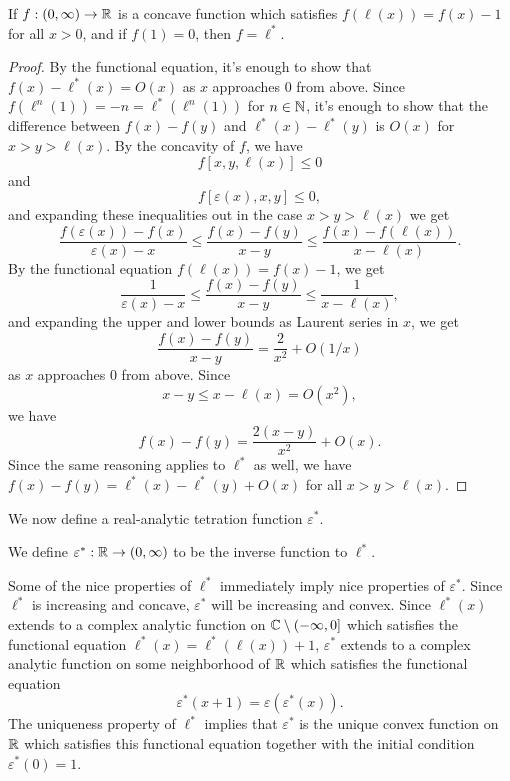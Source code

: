 \documentclass[letterpaper,11pt]{article}
\begin{document}
\begin{prop} If $f : (0,\infty) \rightarrow \mathbb{R}$ is a concave function which satisfies $f(\ell(x)) = f(x) - 1$ for all $x > 0$, and if $f(1) = 0$, then $f = \ell^*$.
\end{prop}
\begin{proof} By the functional equation, it's enough to show that $f(x) - \ell^*(x) = O(x)$ as $x$ approaches $0$ from above. Since $f(\ell^n(1)) = -n = \ell^*(\ell^n(1))$ for $n \in \mathbb{N}$, it's enough to show that the difference between $f(x) - f(y)$ and $\ell^*(x) - \ell^*(y)$ is $O(x)$ for $x > y > \ell(x)$. By the concavity of $f$, we have
\[
f[x,y,\ell(x)] \le 0
\]
and
\[
f[\varepsilon(x),x,y] \le 0,
\]
and expanding these inequalities out in the case $x > y > \ell(x)$ we get
\[
\frac{f(\varepsilon(x)) - f(x)}{\varepsilon(x) - x} \le \frac{f(x) - f(y)}{x-y} \le \frac{f(x) - f(\ell(x))}{x - \ell(x)}.
\]
By the functional equation $f(\ell(x)) = f(x) - 1$, we get
\[
\frac{1}{\varepsilon(x) - x} \le \frac{f(x) - f(y)}{x-y} \le \frac{1}{x - \ell(x)},
\]
and expanding the upper and lower bounds as Laurent series in $x$, we get
\[
\frac{f(x) - f(y)}{x-y} = \frac{2}{x^2} + O(1/x)
\]
as $x$ approaches $0$ from above. Since
\[
x-y \le x - \ell(x) = O(x^2),
\]
we have
\[
f(x) - f(y) = \frac{2(x-y)}{x^2} + O(x).
\]
Since the same reasoning applies to $\ell^*$ as well, we have $f(x) - f(y) = \ell^*(x) - \ell^*(y) + O(x)$ for all $x > y > \ell(x)$.
\end{proof}

We now define a real-analytic tetration function $\varepsilon^*$.

\begin{defn} We define $\varepsilon^* : \mathbb{R} \rightarrow (0,\infty)$ to be the inverse function to $\ell^*$.
\end{defn}

Some of the nice properties of $\ell^*$ immediately imply nice properties of $\varepsilon^*$. Since $\ell^*$ is increasing and concave, $\varepsilon^*$ will be increasing and convex. Since $\ell^*(x)$ extends to a complex analytic function on $\mathbb{C}\setminus (-\infty,0]$ which satisfies the functional equation $\ell^*(x) = \ell^*(\ell(x)) + 1$, $\varepsilon^*$ extends to a complex analytic function on some neighborhood of $\mathbb{R}$ which satisfies the functional equation
\[
\varepsilon^*(x+1) = \varepsilon(\varepsilon^*(x)).
\]
The uniqueness property of $\ell^*$ implies that $\varepsilon^*$ is the unique convex function on $\mathbb{R}$ which satisfies this functional equation together with the initial condition $\varepsilon^*(0) = 1$.
\end{document}
